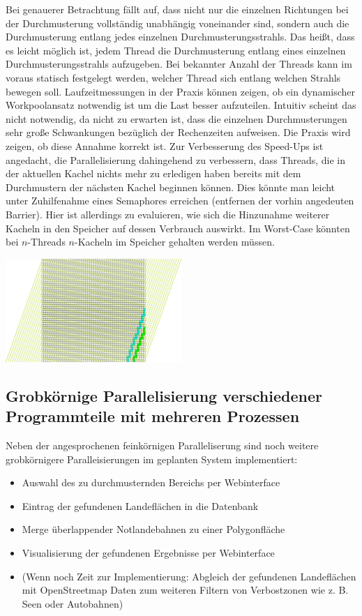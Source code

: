 \documentclass[
11pt, %
a4paper, %
oneside, %
pdfspacing, %
headinclude,
BCOR5mm, %
ngerman, %
bibtotocnumbered,
]{scrartcl}
\begin{document}
Bei genauerer Betrachtung fällt auf, dass nicht nur die einzelnen Richtungen bei der Durchmusterung vollständig unabhängig voneinander sind, sondern auch die Durchmusterung entlang jedes einzelnen Durchmusterungsstrahls. Das heißt, dass es leicht möglich ist, jedem Thread die Durchmusterung entlang eines einzelnen Durchmusterungsstrahls aufzugeben. Bei bekannter Anzahl der Threads kann im voraus statisch festgelegt werden, welcher Thread sich entlang welchen Strahls bewegen soll. Laufzeitmessungen in der Praxis können zeigen, ob ein dynamischer Workpoolansatz notwendig ist um die Last besser aufzuteilen. Intuitiv scheint das nicht notwendig, da nicht zu erwarten ist, dass die einzelnen Durchmusterungen sehr große Schwankungen bezüglich der Rechenzeiten aufweisen. Die Praxis wird zeigen, ob diese Annahme korrekt ist.
Zur Verbesserung des Speed-Ups ist angedacht, die Parallelisierung dahingehend zu verbessern, dass Threads, die in der aktuellen Kachel nichts mehr zu erledigen haben bereits mit dem Durchmustern der nächsten Kachel beginnen können. Dies könnte man leicht unter Zuhilfenahme eines Semaphores erreichen (entfernen der vorhin angedeuten Barrier). Hier ist allerdings zu evaluieren, wie sich die Hinzunahme weiterer Kacheln in den Speicher auf dessen Verbrauch auswirkt. Im Worst-Case könnten bei $n$-Threads $n$-Kacheln im Speicher gehalten werden müssen.


	\includegraphics[width=0.5\textwidth]{./drawings/Durchmusterungspfade_schraeg.png}

\subsection{Grobkörnige Parallelisierung verschiedener Programmteile mit mehreren Prozessen}
Neben der angesprochenen feinkörnigen Paralleliserung sind noch weitere grobkörnigere Paralleisierungen im geplanten System implementiert:
\begin{itemize}
	\item Auswahl des zu durchmusternden Bereichs per Webinterface
	\item Eintrag der gefundenen Landeflächen in die Datenbank 
	\item Merge überlappender Notlandebahnen zu einer Polygonfläche
	\item Visualisierung der gefundenen Ergebnisse per Webinterface
	\item (Wenn noch Zeit zur Implementierung: Abgleich der gefundenen Landeflächen mit OpenStreetmap Daten zum weiteren Filtern von Verbostzonen wie z. B. Seen oder Autobahnen)
\end{itemize}
\end{document}
